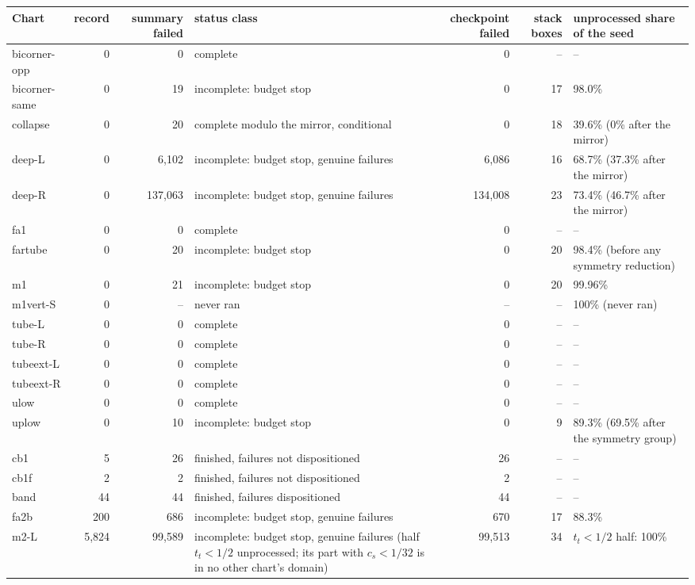 \documentclass[11pt]{article}
\theoremstyle{definition}
\theoremstyle{remark}
\begin{document}
\begin{table}[t]\centering\scriptsize\setlength{\tabcolsep}{2pt}
\begin{tabular}{@{}L{1.5cm}rrL{3.5cm}rrL{3.0cm}@{}}
\toprule
Chart & record & summary failed & status class & checkpoint failed & stack boxes & unprocessed share of the seed \\
\midrule
bicorner-opp & 0 & 0 & complete & 0 & -- & -- \\
bicorner-same & 0 & 19 & incomplete: budget stop & 0 & 17 & 98.0\% \\
collapse & 0 & 20 & complete modulo the mirror, conditional & 0 & 18 & 39.6\% (0\% after the mirror) \\
deep-L & 0 & 6{,}102 & incomplete: budget stop, genuine failures & 6{,}086 & 16 & 68.7\% (37.3\% after the mirror) \\
deep-R & 0 & 137{,}063 & incomplete: budget stop, genuine failures & 134{,}008 & 23 & 73.4\% (46.7\% after the mirror) \\
fa1 & 0 & 0 & complete & 0 & -- & -- \\
fartube & 0 & 20 & incomplete: budget stop & 0 & 20 & 98.4\% (before any symmetry reduction) \\
m1 & 0 & 21 & incomplete: budget stop & 0 & 20 & 99.96\% \\
m1vert-S & 0 & -- & never ran & -- & -- & 100\% (never ran) \\
tube-L & 0 & 0 & complete & 0 & -- & -- \\
tube-R & 0 & 0 & complete & 0 & -- & -- \\
tubeext-L & 0 & 0 & complete & 0 & -- & -- \\
tubeext-R & 0 & 0 & complete & 0 & -- & -- \\
ulow & 0 & 0 & complete & 0 & -- & -- \\
uplow & 0 & 10 & incomplete: budget stop & 0 & 9 & 89.3\% (69.5\% after the symmetry group) \\
\midrule
cb1 & 5 & 26 & finished, failures not dispositioned & 26 & -- & -- \\
cb1f & 2 & 2 & finished, failures not dispositioned & 2 & -- & -- \\
band & 44 & 44 & finished, failures dispositioned & 44 & -- & -- \\
fa2b & 200 & 686 & incomplete: budget stop, genuine failures & 670 & 17 & 88.3\% \\
m2-L & 5{,}824 & 99{,}589 & incomplete: budget stop, genuine failures (half $t_t<1/2$ unprocessed; its part with $c_s<1/32$ is in no other chart's domain) & 99{,}513 & 34 & $t_t<1/2$ half: 100\% \\

\end{tabular}
\end{table}
\end{document}
